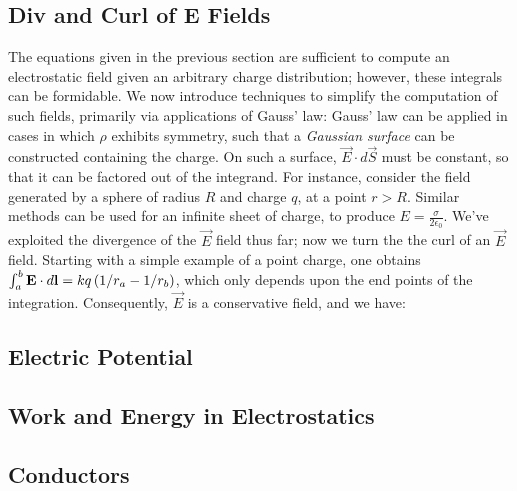 \subsection{Div and Curl of E Fields}
The equations given in the previous section are sufficient to compute an electrostatic field given an arbitrary charge distribution; however, these integrals can be formidable. We now introduce techniques to simplify the computation of such fields, primarily via applications of Gauss' law:
Gauss' law can be applied in cases in which $\rho$ exhibits symmetry, such that a \textit{Gaussian surface} can be constructed containing the charge. On such a surface, $\vec{E}\cdot d\vec{S}$ must be constant, so that it can be factored out of the integrand. For instance, consider the field generated by a sphere of radius $R$ and charge $q$, at a point $r>R$.
Similar methods can be used for an infinite sheet of charge, to produce $E=\frac{\sigma}{2\epsilon_0}$. We've exploited the divergence of the $\vec{E}$ field thus far; now we turn the the curl of an $\vec{E}$ field. Starting with a simple example of a point charge, one obtains $\int_a^b \boldsymbol{\mathbf{E}} \cdot d\boldsymbol{\mathbf{l}} = kq \left(1/r_a - 1/r_b\right)$, which only depends upon the end points of the integration. Consequently, $\vec{E}$ is a conservative field, and we have:
\subsection{Electric Potential}
\subsection{Work and Energy in Electrostatics}
\subsection{Conductors}


